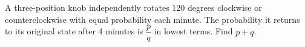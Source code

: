 A three-position knob independently rotates 120 degrees clockwise or counterclockwise with equal probability each minute. The probability it returns to its original state after 4 minutes is $\dfrac{p}{q}$ in lowest terms. Find $p+q$.
